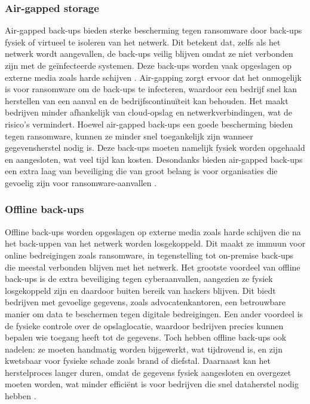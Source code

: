 \subsubsection{Air-gapped storage}
Air-gapped back-ups bieden sterke bescherming tegen ransomware door back-ups fysiek of virtueel te isoleren van het netwerk. Dit betekent dat, zelfs als het netwerk wordt aangevallen, de back-ups veilig blijven omdat ze niet verbonden zijn met de geïnfecteerde systemen. Deze back-ups worden vaak opgeslagen op externe media zoals harde schijven \autocite{Bryant2015}. Air-gapping zorgt ervoor dat het onmogelijk is voor ransomware om de back-ups te infecteren, waardoor een bedrijf snel kan herstellen van een aanval en de bedrijfscontinuïteit kan behouden. Het maakt bedrijven minder afhankelijk van cloud-opslag en netwerkverbindingen, wat de risico’s vermindert. Hoewel air-gapped back-ups een goede bescherming bieden tegen ransomware, kunnen ze minder snel toegankelijk zijn wanneer gegevensherstel nodig is. Deze back-ups moeten namelijk fysiek worden opgehaald en aangesloten, wat veel tijd kan kosten. Desondanks bieden air-gapped back-ups een extra laag van beveiliging die van groot belang is voor organisaties die gevoelig zijn voor ransomware-aanvallen \autocite{Park2023}.

\subsubsection{Offline back-ups}
Offline back-ups worden opgeslagen op externe media zoals harde schijven die na het back-uppen van het netwerk worden losgekoppeld\autocite{Edwards2022}. Dit maakt ze immuun voor online bedreigingen zoals ransomware, in tegenstelling tot on-premise back-ups die meestal verbonden blijven met het netwerk. Het grootste voordeel van offline back-ups is de extra beveiliging tegen cyberaanvallen, aangezien ze fysiek losgekoppeld zijn en daardoor buiten bereik van hackers blijven. Dit biedt bedrijven met gevoelige gegevens, zoals advocatenkantoren, een betrouwbare manier om data te beschermen tegen digitale bedreigingen. Een ander voordeel is de fysieke controle over de opslaglocatie, waardoor bedrijven precies kunnen bepalen wie toegang heeft tot de gegevens. Toch hebben offline back-ups ook nadelen: ze moeten handmatig worden bijgewerkt, wat tijdrovend is, en zijn kwetsbaar voor fysieke schade zoals brand of diefstal. Daarnaast kan het herstelproces langer duren, omdat de gegevens fysiek aangesloten en overgezet moeten worden, wat minder efficiënt is voor bedrijven die snel dataherstel nodig hebben \autocite{James2019}.

